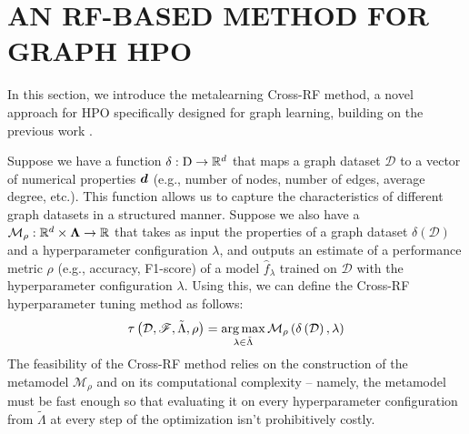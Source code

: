 \section{\uppercase{An RF-based Method for Graph HPO}}
\label{sec:cross-rf}

In this section, we introduce the metalearning Cross-RF method, a novel approach for HPO specifically designed for graph learning, building on the previous work \cite{prochazka_which_2023}.

Suppose we have a  function \( \delta : \mathrm{D} \to \mathbb{R}^d \) that maps a graph dataset \( \mathcal{D} \) to a vector of numerical properties \( \boldsymbol{d} \) (e.g., number of nodes, number of edges, average degree, etc.). This function allows us to capture the characteristics of different graph datasets in a structured manner. Suppose we also have a  \( \mathcal{M}_\rho : \mathbb{R}^d \times \boldsymbol\Lambda \to \mathbb{R} \) that takes as input the properties of a graph dataset \( \delta \left( \mathcal{D} \right) \) and a hyperparameter configuration \( \lambda \), and outputs an estimate of a performance metric \( \rho \) (e.g., accuracy, F1-score) of a model \( \hat{f}_\lambda \) trained on \( \mathcal{D} \) with the hyperparameter configuration \( \lambda \). Using this, we can define the Cross-RF hyperparameter tuning method as follows:
\begin{equation*}
	\tau \left( \mathcal{D}, \mathscr{F}, \tilde{\Lambda}, \rho \right) = \operatorname*{arg\,max}_{\lambda \in \tilde{\Lambda}} \mathcal{M}_\rho \left( \delta \left( \mathcal{D} \right), \lambda \right)
\end{equation*}
The feasibility of the Cross-RF method relies on the construction of the metamodel \( \mathcal{M}_\rho \) and on its computational complexity -- namely, the metamodel must be fast enough so that evaluating it on every hyperparameter configuration from \( \tilde{\Lambda} \) at every step of the optimization isn't prohibitively costly.

